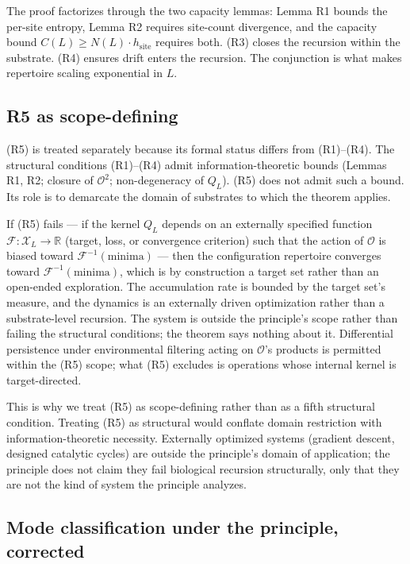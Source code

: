 \documentclass[11pt]{article}
\theoremstyle{plain}
\theoremstyle{definition}
\newcommand{\Xset}{\mathcal{X}}
\newcommand{\Op}{\mathcal{O}}
\begin{document}
The proof factorizes through the two capacity lemmas: Lemma R1 bounds the per-site entropy, Lemma R2 requires site-count divergence, and the capacity bound $C(L) \ge N(L) \cdot h_{\mathrm{site}}$ requires both. (R3) closes the recursion within the substrate. (R4) ensures drift enters the recursion. The conjunction is what makes repertoire scaling exponential in $L$.

\subsection{R5 as scope-defining}

(R5) is treated separately because its formal status differs from (R1)--(R4). The structural conditions (R1)--(R4) admit information-theoretic bounds (Lemmas R1, R2; closure of $\Op^2$; non-degeneracy of $Q_L$). (R5) does not admit such a bound. Its role is to demarcate the domain of substrates to which the theorem applies.

If (R5) fails --- if the kernel $Q_L$ depends on an externally specified function $\mathcal{F}: \Xset_L \to \mathbb{R}$ (target, loss, or convergence criterion) such that the action of $\Op$ is biased toward $\mathcal{F}^{-1}(\text{minima})$ --- then the configuration repertoire converges toward $\mathcal{F}^{-1}(\text{minima})$, which is by construction a target set rather than an open-ended exploration. The accumulation rate is bounded by the target set's measure, and the dynamics is an externally driven optimization rather than a substrate-level recursion. The system is outside the principle's scope rather than failing the structural conditions; the theorem says nothing about it. Differential persistence under environmental filtering acting on $\Op$'s products is permitted within the (R5) scope; what (R5) excludes is operations whose internal kernel is target-directed.

This is why we treat (R5) as scope-defining rather than as a fifth structural condition. Treating (R5) as structural would conflate domain restriction with information-theoretic necessity. Externally optimized systems (gradient descent, designed catalytic cycles) are outside the principle's domain of application; the principle does not claim they fail biological recursion structurally, only that they are not the kind of system the principle analyzes.

\subsection{Mode classification under the principle, corrected}
\end{document}
